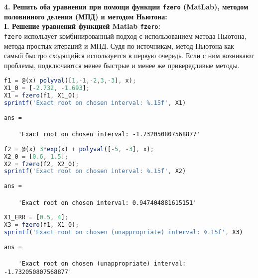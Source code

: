 \clearpage

{\Large{\textbf{4. Решить оба уравнения при помощи функции \texttt{fzero} (MatLab), методом половинного деления (МПД) и методом Ньютона:}}}\\

{\large\bf{I. Решение уравнений функцией Matlab \texttt{fzero}:}}\\
\texttt{fzero} использует комбинированный подход с использованием метода Ньютона, метода простых итераций и МПД. Судя по источникам, метод Ньютона как самый быстро сходящийся используется в первую очередь. Если с ним возникают проблемы, подключаются менее быстрые и менее же привередливые методы.

\begin{lstlisting}[language=Octave]
% Polynomial function
f1 = @(x) polyval([1,-1,-2,3,-3], x);
X1_0 = [-2.732, -1.693];
X1 = fzero(f1, X1_0);
sprintf('Exact root on chosen interval: %.15f', X1)
\end{lstlisting}
{\singlespacing
\begin{verbatim}
ans =

    'Exact root on chosen interval: -1.732050807568877'
\end{verbatim}}
\begin{lstlisting}[language=Octave, firstnumber=6]
% Transcendental function
f2 = @(x) 3*exp(x) + polyval([-5, -3], x);
X2_0 = [0.6, 1.5];
X2 = fzero(f2, X2_0);
sprintf('Exact root on chosen interval: %.15f', X2)
\end{lstlisting}
{\singlespacing
\begin{verbatim}
ans =

    'Exact root on chosen interval: 0.947404881615151'
\end{verbatim}}
\begin{lstlisting}[language=Octave, firstnumber=11]
% Root for interval, where Newton method conditions violate
X1_ERR = [0.5, 4];
X3 = fzero(f1, X1_0);
sprintf('Exact root on chosen (unappropriate) interval: %.15f', X3)
\end{lstlisting}
{\singlespacing
    \begin{verbatim}
ans =

    'Exact root on chosen (unappropriate) interval: -1.732050807568877'
\end{verbatim}}

\clearpage

